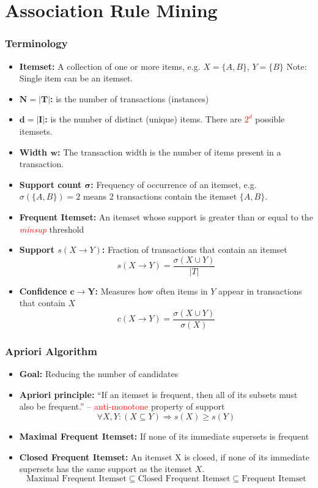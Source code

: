 \documentclass[aspectratio=169, 10pt]{beamer}
\begin{document}
\section{Association Rule Mining}
\begin{frame}[t]
\frametitle{Terminology}
\small

\begin{itemize}
    \item \textbf{Itemset:} A collection of one or more items, e.g. $X = \{A, B\}$, $Y =\{ B \}$ Note: Single item can be an itemset.
    \item \textbf{$\bm{N = |T|}$:} is the number of transactions (instances)
    \item \textbf{$\bm{d = |I|}$:} is the number of distinct (unique) items. There are \textcolor{red}{$2^d$} possible itemsets.
    \item \textbf{Width $\bm{w}$:} The transaction width is the number of items present in a transaction.
    \item \textbf{Support count $\bm{\sigma}$:} Frequency of occurrence of an itemset, e.g. $\sigma(\{A, B\})=2$ means 2 transactions contain the itemset $\{A, B\}$.
    \item \textbf{Frequent Itemset:} An itemset whose support is greater than or equal to the \textcolor{red}{\textit{minsup}} threshold
    \item \textbf{Support $s(X \to Y)$:} Fraction of transactions that contain an itemset
        \[ s(X \to Y) = \frac{\sigma(X \cup Y)}{|T|} \] 
    \item \textbf{Confidence $\bm{c \to Y}$:} Measures how often items in $Y$ appear in transactions that contain $X$
        \[ c(X \to Y) = \frac{\sigma(X \cup Y)}{\sigma(X)} \] 
\end{itemize}


\end{frame}

\begin{frame}[t]
\frametitle{Apriori Algorithm}

\begin{itemize}
    \item \textbf{Goal:} Reducing the number of candidates
    \item \textbf{Apriori principle:} ``If an itemset is frequent, then all of its subsets must also be frequent.'' -- \textcolor{red}{anti-monotone} property of support
        \[ \forall X, Y:(X \subseteq Y) \Rightarrow s(X) \geq s(Y) \]
    \item \textbf{Maximal Frequent Itemset:} If none of its immediate supersets is frequent
    \item \textbf{Closed Frequent Itemset:} An itemset X is closed, if none of its immediate supersets has the same support as the itemset $X$.
        \[ \text{Maximal Frequent Itemset} \subseteq \text{Closed Frequent Itemset} \subseteq \text{Frequent Itemset} \]
\end{itemize}

\end{frame}
\end{document}
